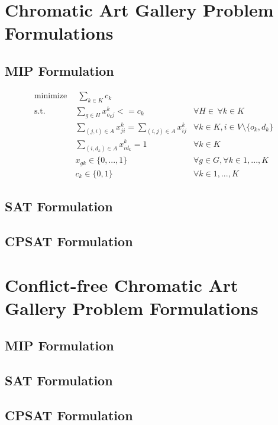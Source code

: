\chapter{Chromatic Art Gallery Problem Formulations}

\section{MIP Formulation}

\begin{align}
\label{eq:f.0} \mbox{minimize}~& \;\sum_{k\in K} c_{k}& \\
\label{eq:f.1} \mbox{s.t. } &\sum_{g \in H}x_{o_kj}^{k} <= c_{k} & \forall H \in \, \forall k\in K\\
\label{eq:f.2}&\sum_{(j,i)\in A}x_{ji}^{k}=\sum_{(i,j)\in A}x_{ij}^{k} & \forall k\in K, i\in V \setminus \{o_k,d_k\}\\
\label{eq:f.3}&\sum_{(i,d_k)\in A}x_{id_k}^{k}=1 & \forall k \in K\\
\label{eq:f.4}& x_{gk} \in \{0,...,1\} & \forall g \in G, \forall k \in {1,...,K}\\
\label{eq:f.5}& c_{k} \in \{0,1\} & \forall k\in {1,...,K}
\end{align}

\section{SAT Formulation}

\section{CPSAT Formulation}

\chapter{Conflict-free Chromatic Art Gallery Problem Formulations}

\section{MIP Formulation}

\section{SAT Formulation}

\section{CPSAT Formulation}

